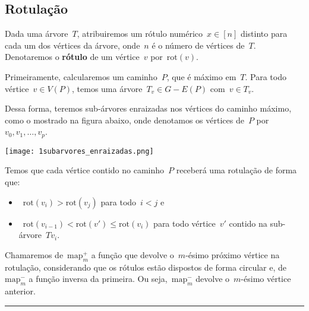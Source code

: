 \documentclass[a0,portrait]{a0poster}
\newcommand{\rot}{\mathrm{rot}}
\newcommand{\map}{\mathrm{map}}
\begin{document}
\begin{multicols}{3}

\section*{Rotulação}
	Dada uma árvore~$T$, atribuiremos um 
	rótulo numérico~${x\in [n]}$ distinto para cada um dos vértices 
	da árvore, onde~$n$ é o número de vértices de~$T$. 
	Denotaremos o \textbf{rótulo} de um vértice~$v$ por~$\rot(v)$.

	Primeiramente, calcularemos 
	um caminho~$P$, que é máximo em~$T$. 
	Para todo vértice~${v\in V(P)}$, temos uma 
	árvore~${T_v \in G - E(P)}$ com~$v\in T_v$.

	Dessa forma, teremos sub-árvores enraizadas nos vértices do
	caminho máximo, como o mostrado na figura abaixo, onde denotamos
	os vértices de~$P$ por~${v_0,v_1,\ldots,v_p}$.
    
\texttt{[image: 1subarvores\_enraizadas.png]}

Temos que cada vértice contido no caminho~$P$ receberá 
	uma rotulação de forma que:
	\begin{itemize}
		\item~${\rot(v_i)>\rot(v_j)}$ para todo~${i<j}$ e
		\item~${\rot(v_{i-1})<\rot(v') \le \rot(v_i)}$ para todo 
		vértice~$v'$ contido na sub-árvore~$T{v_i}$. 
	\end{itemize}
    
	Chamaremos de~${\map^+_m}$ a função que devolve o~$m$-ésimo 
	próximo vértice na rotulação, considerando que os rótulos
	estão dispostos de forma circular
	e, de~${\map^-_m}$ a função inversa da primeira. 
	Ou seja,~${\map^-_m}$ devolve o~$m$-ésimo vértice anterior.

\noindent\rule[0.5ex]{\linewidth}{1pt}




\end{multicols}
\end{document}
